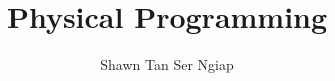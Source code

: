 \documentclass[a4paper,10pt]{book}
\begin{document}
\title{Physical Programming}
\author{Shawn Tan Ser Ngiap}

\maketitle

% 



\end{document}
